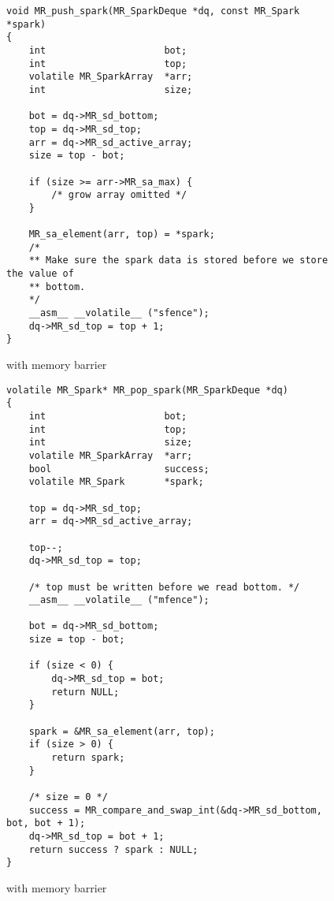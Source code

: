 
\begin{figure}
\begin{verbatim}
void MR_push_spark(MR_SparkDeque *dq, const MR_Spark *spark)
{
    int                     bot;
    int                     top;
    volatile MR_SparkArray  *arr;
    int                     size;

    bot = dq->MR_sd_bottom;
    top = dq->MR_sd_top;
    arr = dq->MR_sd_active_array;
    size = top - bot;

    if (size >= arr->MR_sa_max) {
        /* grow array omitted */
    }

    MR_sa_element(arr, top) = *spark;
    /*
    ** Make sure the spark data is stored before we store the value of
    ** bottom.
    */
    __asm__ __volatile__ ("sfence");
    dq->MR_sd_top = top + 1;
}
\end{verbatim}
\caption{\push with memory barrier}
\label{fig:MR_push_spark}
\end{figure}

\begin{figure}
\begin{verbatim}
volatile MR_Spark* MR_pop_spark(MR_SparkDeque *dq)
{
    int                     bot;
    int                     top;
    int                     size;
    volatile MR_SparkArray  *arr;
    bool                    success;
    volatile MR_Spark       *spark;
   
    top = dq->MR_sd_top;
    arr = dq->MR_sd_active_array;

    top--;
    dq->MR_sd_top = top;

    /* top must be written before we read bottom. */
    __asm__ __volatile__ ("mfence");

    bot = dq->MR_sd_bottom;
    size = top - bot;

    if (size < 0) {
        dq->MR_sd_top = bot;
        return NULL;
    }

    spark = &MR_sa_element(arr, top);
    if (size > 0) {
        return spark;
    }

    /* size = 0 */
    success = MR_compare_and_swap_int(&dq->MR_sd_bottom, bot, bot + 1);
    dq->MR_sd_top = bot + 1;
    return success ? spark : NULL;
}
\end{verbatim}
\caption{\pop with memory barrier}
\label{fig:MR_pop_spark}
\end{figure}

